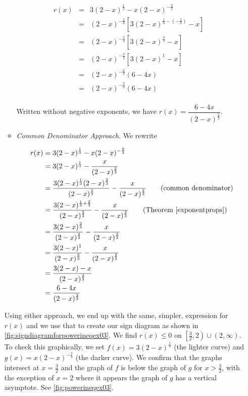 \begin{ex}
\begin{enumerate}
\begin{itemize}
\[ \begin{array}{rclr}

r(x)  & = & 3 (2-x)^{\frac{1}{3}} - x (2-x)^{-\frac{2}{3}} & \\ [3pt]
      & = & (2-x)^{-\frac{2}{3}} \left[ 3 (2-x)^{\frac{1}{3} - \left(-\frac{2}{3}\right)} - x\right] & \\ [6pt]
      & = & (2-x)^{-\frac{2}{3}}\left[3(2-x)^{\frac{3}{3}} - x\right] & \\ [3pt]
      & = & (2-x)^{-\frac{2}{3}}\left[3(2-x)^{1} - x\right] &  \\ [3pt]
      & = & (2-x)^{-\frac{2}{3}}\left(6-4x\right) & \\ [3pt]
      & = & (2-x)^{-\frac{2}{3}}\left(6-4x\right) & \\
      
\end{array}\]

Written without negative exponents, we have $r(x) = \dfrac{6-4x}{(2-x)^{\frac{2}{3}}}$.

\item \textit{Common Denominator Approach.}  We rewrite 

\begin{align*}
r(x)  & = 3 (2-x)^{\frac{1}{3}} - x (2-x)^{-\frac{2}{3}} \\
      & = 3 (2-x)^{\frac{1}{3}} - \dfrac{x}{(2-x)^{\frac{2}{3}}} \\
      & = \dfrac{3 (2-x)^{\frac{1}{3}}(2-x)^{\frac{2}{3}}}{(2-x)^{\frac{2}{3}}} - \dfrac{x}{(2-x)^{\frac{2}{3}}} \tag{common denominator} \\
      & = \dfrac{3 (2-x)^{\frac{1}{3} + \frac{2}{3}}}{(2-x)^{\frac{2}{3}}} - \dfrac{x}{(2-x)^{\frac{2}{3}}} \tag{Theorem \ref{exponentprops}}  \\
      & = \dfrac{3 (2-x)^{\frac{3}{3}}}{(2-x)^{\frac{2}{3}}} - \dfrac{x}{(2-x)^{\frac{2}{3}}} \\
      & = \dfrac{3 (2-x)^1}{(2-x)^{\frac{2}{3}}} - \dfrac{x}{(2-x)^{\frac{2}{3}}} \\
      & = \dfrac{3 (2-x) - x}{(2-x)^{\frac{2}{3}}} \\
      & = \dfrac{6-4x}{(2-x)^{\frac{2}{3}}} \\
\end{align*}

\end{itemize}

Using either approach, we end up with the same, simpler, expression for $r(x)$ and we use that to create our sign diagram as shown in \autoref{fig:signdiagramforpowerineqex03}.  We find $r(x) \leq 0$ on $\left[\frac{3}{2},2\right) \cup (2, \infty)$.  To check this graphically, we set $f(x)=3 (2-x)^{\frac{1}{3}}$ (the lighter curve) and $g(x) = x (2-x)^{-\frac{2}{3}}$ (the darker curve). We confirm that the graphs intersect at $x=\frac{3}{2}$ and the graph of $f$ is below the graph of $g$ for $x > \frac{3}{2}$, with the exception of $x=2$ where it appears the graph of $g$ has a vertical asymptote. See \autoref{fig:powerineqex03}.


\end{enumerate}
\end{ex}
